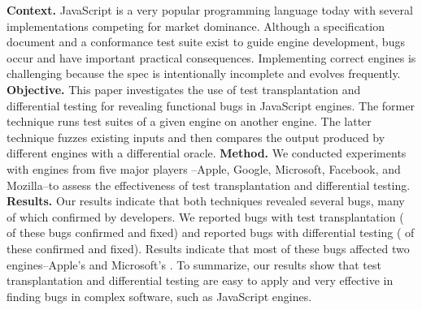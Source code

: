 \textbf{Context.}
JavaScript is a very popular programming language today with several
implementations competing for market dominance. Although a
specification document and a conformance test suite exist to guide
engine development, bugs occur and have important practical
consequences. Implementing correct
engines is challenging because the spec is intentionally
incomplete and evolves frequently.
\textbf{Objective.}
This paper investigates the use of test transplantation and differential testing
for revealing functional bugs in JavaScript engines.
The former technique runs test suites of a given engine on another engine.
The latter technique fuzzes existing inputs
and then compares the output produced by different engines with a differential oracle.
\textbf{Method.}
We conducted experiments with engines from five major players
--Apple, Google, Microsoft, Facebook, and Mozilla--to assess the effectiveness of 
test transplantation and differential testing.
\textbf{Results.}
Our results indicate that both techniques revealed several bugs, many of which
confirmed by developers. We reported \noBugsTransplantation{} bugs
with test transplantation (\noBugsTransplantationConfirmed{} of these bugs
confirmed and \noBugsTransplantationFixed{} fixed) and reported
\noBugsDifferentialTesting{} bugs with differential testing
(\noBugsDifferentialTestingConfirmed{} of these confirmed
and \noBugsDifferentialTestingFixed{} fixed). Results indicate that
most of these bugs affected two engines--Apple's
\jsc{} and Microsoft's \chakra{}.
To summarize, our results show that
test transplantation and differential testing
are easy to apply and very effective in
finding bugs in complex software, such as JavaScript engines.
